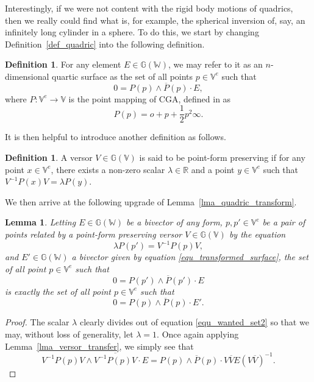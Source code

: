 \documentclass{birkjour}
\newtheorem{lem}[thm]{Lemma}
\theoremstyle{definition}
\newtheorem{defn}[thm]{Definition}
\theoremstyle{remark}
\numberwithin{equation}{section}
\newcommand{\G}{\mathbb{G}}
\newcommand{\V}{\mathbb{V}}
\newcommand{\W}{\mathbb{W}}
\newcommand{\R}{\mathbb{R}}
\newcommand{\nvao}{o}
\newcommand{\nvai}{\infty}
\begin{document}
Interestingly, if we were not content with the rigid body motions of
quadrics, then we really could find what is, for example, the spherical
inversion of, say, an infinitely long cylinder in a sphere.  To do this, we start by changing
Definition~\ref{def_quadric} into the following definition.
\begin{defn}\label{def_surface}
For any element $E\in\G(\W)$, we may refer to it as an $n$-dimensional
quartic surface as the set of all points $p\in\V^e$ such that
\begin{equation}\label{equ_surface_set}
0 = P(p)\wedge\overline{P}(p)\cdot E,
\end{equation}
where $P:\V^e\to\V$ is the point mapping of CGA, defined in \cite{Hestenes01} as
\begin{equation}\label{equ_cga_point_map}
P(p) = \nvao + p + \frac{1}{2}p^2\nvai.
\end{equation}
\end{defn}
It is then helpful to introduce another definition as follows.
\begin{defn}\label{def_preserve_point_map}
A versor $V\in\G(\V)$ is said to be point-form preserving if for
any point $x\in\V^e$, there exists a non-zero scalar $\lambda\in\R$ and
a point $y\in\V^e$ such that $V^{-1}P(x)V=\lambda P(y)$.
\end{defn}
We then arrive at the following upgrade of Lemma~\ref{lma_quadric_transform}.
\begin{lem}\label{lma_quartic_transform}
Letting $E\in\G(\W)$ be a bivector of any form, $p,p'\in\V^e$ be
a pair of points related by a point-form preserving versor $V\in\G(\V)$ by
the equation
\begin{equation}
\lambda P(p') = V^{-1}P(p)V,
\end{equation}
and $E'\in\G(\W)$ a bivector given by equation \eqref{equ_transformed_surface},
the set of all point $p\in\V^e$ such that
\begin{equation}\label{equ_wanted_set2}
0 = P(p')\wedge\overline{P}(p')\cdot E
\end{equation}
is exactly the set of all point $p\in\V^e$ such that
\begin{equation}
0 = P(p)\wedge\overline{P}(p)\cdot E'.
\end{equation}
\end{lem}
\begin{proof}
The scalar $\lambda$ clearly divides out of equation \eqref{equ_wanted_set2} so that we may,
without loss of generality, let $\lambda=1$.
Once again applying Lemma~\ref{lma_versor_transfer}, we simply see that
\begin{equation}
V^{-1}P(p)V\wedge\overline{V^{-1}P(p)V}\cdot E = P(p)\wedge\overline{P}(p)\cdot V\overline{V}E(V\overline{V})^{-1}.
\end{equation}
\end{proof}
\end{document}
